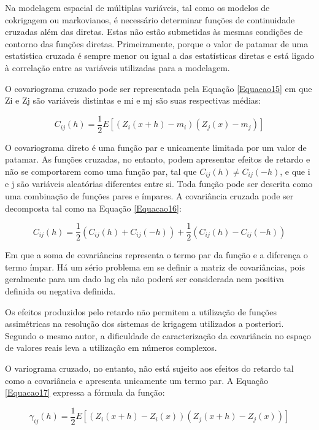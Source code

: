 Na modelagem espacial de múltiplas variáveis, tal como os modelos de cokrigagem ou markovianos, é necessário determinar funções de continuidade cruzadas além das diretas. Estas não estão submetidas às mesmas condições de contorno das funções diretas. Primeiramente, porque o valor de patamar de uma estatística cruzada é sempre menor ou igual a das estatísticas diretas e está ligado à correlação entre as variáveis utilizadas para a modelagem.  

O covariograma cruzado pode ser representada pela Equação \ref{Equacao15} em que Zi e Zj são variáveis distintas e mi e mj são suas respectivas médias: 

\begin{equation}\label{Equacao15}
C_{ij}(h) = \frac{1}{2} E\left[ \left( Z_i(x+h) -m_i \right) \left( Z_j(x) -m_j \right)\right] 
\end{equation}

O covariograma direto é uma função par e unicamente limitada por um valor de patamar. As funções cruzadas, no entanto, podem apresentar efeitos de retardo e não se comportarem como uma função par, tal que $C_{ij} (h)\neq C_{ij} (-h)$, e que i e j são variáveis aleatórias diferentes entre si. 
Toda função pode ser descrita como uma combinação de funções pares e ímpares. A covariância cruzada pode ser decomposta tal como na Equação \ref{Equacao16}:

\begin{equation}\label{Equacao16}
C_{ij}(h) = \frac{1}{2}\left( C_{ij}(h)+C_{ij}(-h)\right) +\frac{1}{2}\left( C_{ij}(h)-C_{ij}(-h)\right)
\end{equation}

Em que a soma de covariâncias representa o termo par da função e a diferença o termo ímpar. Há um sério problema em se definir a matriz de covariâncias, pois geralmente para um dado lag ela não poderá ser considerada nem positiva definida ou negativa definida. 

Os efeitos produzidos pelo retardo não permitem a utilização de funções assimétricas na resolução dos sistemas de krigagem utilizados a posteriori. Segundo o mesmo autor, a dificuldade de caracterização da covariância no espaço de valores reais leva a utilização em números complexos. 

O variograma cruzado, no entanto, não está sujeito aos efeitos do retardo tal como a covariância e apresenta unicamente um termo par. A Equação \ref{Equacao17} expressa a fórmula da função: 

\begin{equation}\label{Equacao17}
\gamma_{ij}(h) = \frac{1}{2}E\left[ \left( Z_i(x+h) - Z_i(x)\right) \left( Z_j(x+h) - Z_j(x)\right) \right] 
\end{equation}

